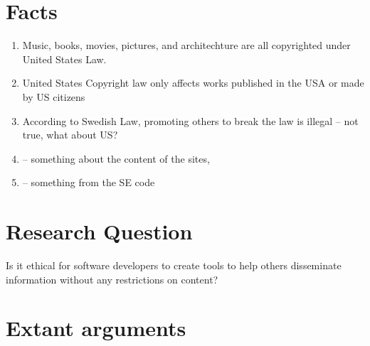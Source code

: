 \documentclass[11pt]{article}
\begin{document}
\section{Facts}
\begin{enumerate}
\item Music, books, movies, pictures, and architechture are all copyrighted under United States Law. \cite{t17c1s102}
\item United States Copyright law only affects works published in the USA or made by US citizens \cite{t17c1s103}
\item According to Swedish Law, promoting others to break the law is illegal -- not true, what about US?
\item -- something about the content of the sites,
\item -- something from the SE code
\end{enumerate}

\section{Research Question}

Is it ethical for software developers to create tools to help others disseminate information without any restrictions on content?

\section{Extant arguments}
\end{document}
